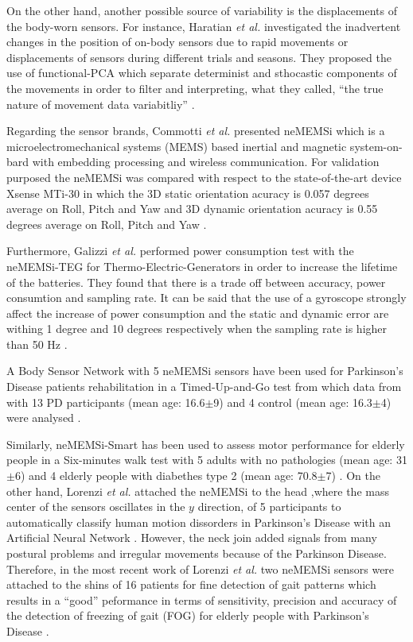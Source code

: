 \documentclass[10pt,journal,onecolumn,compsoc]{IEEEtran}
\begin{document}
On the other hand, another possible source of variability is the displacements of the body-worn sensors. 
For instance, Haratian \textit{et al.} investigated the inadvertent changes in the position of on-body sensors 
due to rapid movements or displacements of sensors during different trials and seasons.
They proposed the use of functional-PCA 
which separate determinist and sthocastic components of the movements
in order to filter and interpreting, what they called, ``the true nature of movement data variabitliy'' 
\cite{Haratian2012,Haratian2014,Haratian2016}.



Regarding the sensor brands, 
Commotti \textit{et al.} presented neMEMSi which is a microelectromechanical systems (MEMS)  based inertial and magnetic 
system-on-bard with embedding processing and wireless communication.
For validation purposed the neMEMSi was compared with respect to the state-of-the-art device Xsense MTi-30
in which the 3D static orientation acuracy is 0.057 degrees average on Roll, Pitch and Yaw 
and 3D dynamic orientation acuracy is 0.55 degrees average on Roll, Pitch and Yaw \cite{Comotti2014}.

Furthermore, Galizzi \textit{et al.} performed power consumption test with the 
neMEMSi-TEG for Thermo-Electric-Generators in order to increase the lifetime of the batteries.
They found that there is a trade off between accuracy, power consumtion and sampling rate.
It can be said that the use of a gyroscope strongly affect the increase of power consumption
and the static and dynamic error are withing 1 degree and 10 degrees respectively 
when the sampling rate is higher than 50 Hz \cite{Galizzi2015}.

A Body Sensor Network with 5 neMEMSi sensors have been used for Parkinson's Disease patients rehabilitation 
in a Timed-Up-and-Go test 
from which data from with 13 PD participants (mean age: 16.6$\pm$9) and 4 control (mean age: 16.3$\pm$4)
were analysed \cite{Caldara2014}.

Similarly, neMEMSi-Smart has been used to assess motor performance for elderly people
in a Six-minutes walk test with 5 adults with no pathologies (mean age: 31$\pm$6)
and 4 elderly people with diabethes type 2 (mean age: 70.8$\pm$7) \cite{Caldara2015}.
On the other hand, Lorenzi \textit{et al.} attached the  neMEMSi to the head 
,where the mass center of the sensors oscillates in the $y$ direction,
of 5 participants to automatically classify human motion dissorders in Parkinson's Disease
with an Artificial Neural Network \cite{Lorenzi2015}.
However, the neck join added signals from many postural problems
and irregular movements because of the Parkinson Disease.
Therefore, in the most recent work of Lorenzi \textit{et al.} two neMEMSi sensors were attached to the shins
of 16 patients for fine detection of gait patterns
which results in a ``good'' peformance in terms of sensitivity, precision and accuracy of 
the detection of freezing of gait (FOG) for elderly people with Parkinson's Disease  \cite{Lorenzi2016}.
\end{document}
